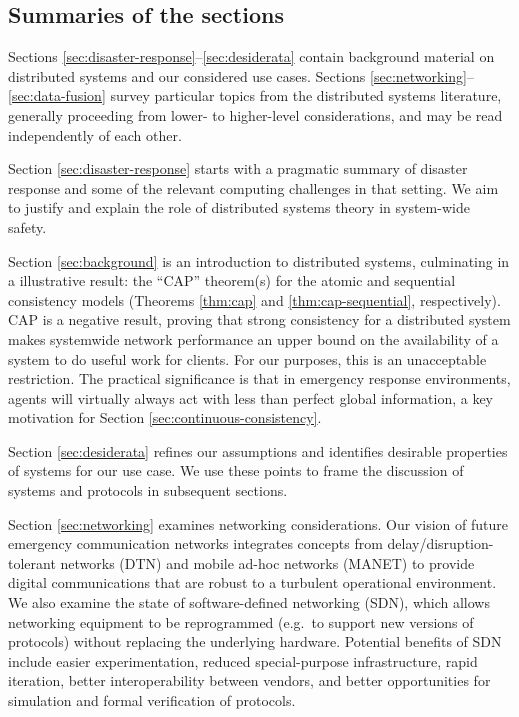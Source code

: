 \documentclass[]             %
{NASA}                       %
\theoremstyle{definition}
\begin{document}
\hypertarget{summaries-of-the-sections}{%
\subsection{Summaries of the sections}\label{summaries-of-the-sections}}

Sections \ref{sec:disaster-response}--\ref{sec:desiderata} contain
background material on distributed systems and our considered use cases.
Sections \ref{sec:networking}--\ref{sec:data-fusion} survey particular
topics from the distributed systems literature, generally proceeding
from lower- to higher-level considerations, and may be read
independently of each other.

Section \ref{sec:disaster-response} starts with a pragmatic summary of
disaster response and some of the relevant computing challenges in that
setting. We aim to justify and explain the role of distributed systems
theory in system-wide safety.

Section \ref{sec:background} is an introduction to distributed systems,
culminating in a illustrative result: the ``CAP'' theorem(s) for the
atomic and sequential consistency models (Theorems \ref{thm:cap} and
\ref{thm:cap-sequential}, respectively). CAP is a negative result,
proving that strong consistency for a distributed system makes
systemwide network performance an upper bound on the availability of a
system to do useful work for clients. For our purposes, this is an
unacceptable restriction. The practical significance is that in
emergency response environments, agents will virtually always act with
less than perfect global information, a key motivation for Section
\ref{sec:continuous-consistency}.

Section \ref{sec:desiderata} refines our assumptions and identifies
desirable properties of systems for our use case. We use these points to
frame the discussion of systems and protocols in subsequent sections.

Section \ref{sec:networking} examines networking considerations. Our
vision of future emergency communication networks integrates concepts
from delay/disruption-tolerant networks (DTN) and mobile ad-hoc networks
(MANET) to provide digital communications that are robust to a turbulent
operational environment. We also examine the state of software-defined
networking (SDN), which allows networking equipment to be reprogrammed
(e.g.~to support new versions of protocols) without replacing the
underlying hardware. Potential benefits of SDN include easier
experimentation, reduced special-purpose infrastructure, rapid
iteration, better interoperability between vendors, and better
opportunities for simulation and formal verification of protocols.
\end{document}
